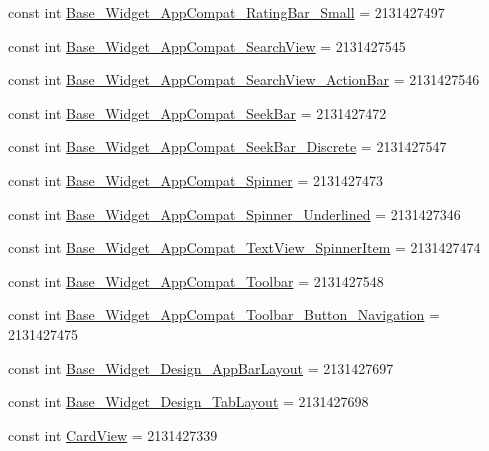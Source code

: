 \begin{CompactItemize}
\item 
const int \hyperlink{class__2doo_1_1_droid_1_1_resource_1_1_style_8de44b0731770cfecb41edbbcc120fb4}{Base\_\-Widget\_\-AppCompat\_\-RatingBar\_\-Small} = 2131427497
\item 
const int \hyperlink{class__2doo_1_1_droid_1_1_resource_1_1_style_688e496fd3be83323917f5203f8d681b}{Base\_\-Widget\_\-AppCompat\_\-SearchView} = 2131427545
\item 
const int \hyperlink{class__2doo_1_1_droid_1_1_resource_1_1_style_c5635f4aa19ac8521ba6d8c2f3405a71}{Base\_\-Widget\_\-AppCompat\_\-SearchView\_\-ActionBar} = 2131427546
\item 
const int \hyperlink{class__2doo_1_1_droid_1_1_resource_1_1_style_509f4d53e9c566c61b8b3c588accfabc}{Base\_\-Widget\_\-AppCompat\_\-SeekBar} = 2131427472
\item 
const int \hyperlink{class__2doo_1_1_droid_1_1_resource_1_1_style_56ae220c0af60431c0a746a51a0eff61}{Base\_\-Widget\_\-AppCompat\_\-SeekBar\_\-Discrete} = 2131427547
\item 
const int \hyperlink{class__2doo_1_1_droid_1_1_resource_1_1_style_db96c3348913b76623d391a9c31f1ffa}{Base\_\-Widget\_\-AppCompat\_\-Spinner} = 2131427473
\item 
const int \hyperlink{class__2doo_1_1_droid_1_1_resource_1_1_style_2466cf39135efa3f7333a269b78e84da}{Base\_\-Widget\_\-AppCompat\_\-Spinner\_\-Underlined} = 2131427346
\item 
const int \hyperlink{class__2doo_1_1_droid_1_1_resource_1_1_style_03516012bcf9f1649530409b35d5e6e9}{Base\_\-Widget\_\-AppCompat\_\-TextView\_\-SpinnerItem} = 2131427474
\item 
const int \hyperlink{class__2doo_1_1_droid_1_1_resource_1_1_style_910a703285e16e337d8eef9a5a2d6a09}{Base\_\-Widget\_\-AppCompat\_\-Toolbar} = 2131427548
\item 
const int \hyperlink{class__2doo_1_1_droid_1_1_resource_1_1_style_8039104b781c3cdd0349a5b6e582bcc5}{Base\_\-Widget\_\-AppCompat\_\-Toolbar\_\-Button\_\-Navigation} = 2131427475
\item 
const int \hyperlink{class__2doo_1_1_droid_1_1_resource_1_1_style_6d1c6dd30b500721613ad588d2184915}{Base\_\-Widget\_\-Design\_\-AppBarLayout} = 2131427697
\item 
const int \hyperlink{class__2doo_1_1_droid_1_1_resource_1_1_style_7ad103a9efeb7a1d6487826866a4c3a1}{Base\_\-Widget\_\-Design\_\-TabLayout} = 2131427698
\item 
const int \hyperlink{class__2doo_1_1_droid_1_1_resource_1_1_style_d8ddd2eb52803891ce6163aaac7d7cd4}{CardView} = 2131427339

\end{CompactItemize}
